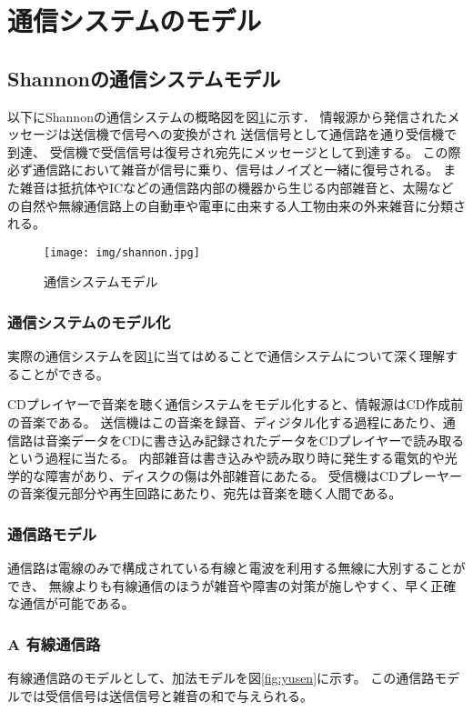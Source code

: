 \documentclass[twocolumn, dvipdfmx, 9pt]{jsarticle}
\begin{document}
\section{通信システムのモデル}
\subsection{Shannonの通信システムモデル}

以下にShannonの通信システムの概略図を図\ref{fig:shannon}に示す．
情報源から発信されたメッセージは送信機で信号への変換がされ
送信信号として通信路を通り受信機で到達、
受信機で受信信号は復号され宛先にメッセージとして到達する。
この際必ず通信路において雑音が信号に乗り、信号はノイズと一緒に復号される。
また雑音は抵抗体やICなどの通信路内部の機器から生じる内部雑音と、太陽などの自然や無線通信路上の自動車や電車に由来する人工物由来の外来雑音に分類される。

\begin{figure}[ht]
  \centering
  \texttt{[image: img/shannon.jpg]}
  \caption{通信システムモデル}
  \label{fig:shannon}
\end{figure}

\subsubsection{通信システムのモデル化}

実際の通信システムを図\ref{fig:shannon}に当てはめることで通信システムについて深く理解することができる。

CDプレイヤーで音楽を聴く通信システムをモデル化すると、情報源はCD作成前の音楽である。
送信機はこの音楽を録音、ディジタル化する過程にあたり、通信路は音楽データをCDに書き込み記録されたデータをCDプレイヤーで読み取るという過程に当たる。
内部雑音は書き込みや読み取り時に発生する電気的や光学的な障害があり、ディスクの傷は外部雑音にあたる。
受信機はCDプレーヤーの音楽復元部分や再生回路にあたり、宛先は音楽を聴く人間である。

\subsubsection{通信路モデル}

通信路は電線のみで構成されている有線と電波を利用する無線に大別することができ、
無線よりも有線通信のほうが雑音や障害の対策が施しやすく、早く正確な通信が可能である。

\subsubsection*{A 有線通信路}
有線通信路のモデルとして、加法モデルを図\ref{fig:yusen}に示す。
この通信路モデルでは受信信号は送信信号と雑音の和で与えられる。
\end{document}
